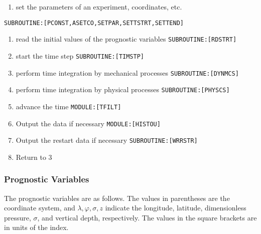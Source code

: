 \begin{enumerate}
\def\labelenumi{\arabic{enumi}.}
\tightlist
\item
  set the parameters of an experiment, coordinates, etc.
\end{enumerate}

\texttt{SUBROUTINE:{[}PCONST,ASETCO,SETPAR,SETTSTRT,SETTEND{]}}

\begin{enumerate}
\def\labelenumi{\arabic{enumi}.}
\setcounter{enumi}{1}
\item
  read the initial values of the prognostic variables \texttt{SUBROUTINE:{[}RDSTRT{]}}
\item
  start the time step \texttt{SUBROUTINE:{[}TIMSTP{]}}
\item
  perform time integration by mechanical processes \texttt{SUBROUTINE:{[}DYNMCS{]}}
\item
  perform time integration by physical processes \texttt{SUBROUTINE:{[}PHYSCS{]}}
\item
  advance the time \texttt{MODULE:{[}TFILT{]}}
\item
  Output the data if necessary \texttt{MODULE:{[}HISTOU{]}}
\item
  Output the restart data if necessary \texttt{SUBROUTINE:{[}WRRSTR{]}}
\item
  Return to 3
\end{enumerate}

\hypertarget{prognostic-variables}{%
\subsubsection{Prognostic Variables}\label{prognostic-variables}}

The prognostic variables are as follows. The values in parentheses are the coordinate system, and \(\lambda,\varphi,\sigma, z\) indicate the longitude, latitude, dimensionless pressure, \(\sigma\),
and vertical depth, respectively. The values in the square brackets are in units of the index.

